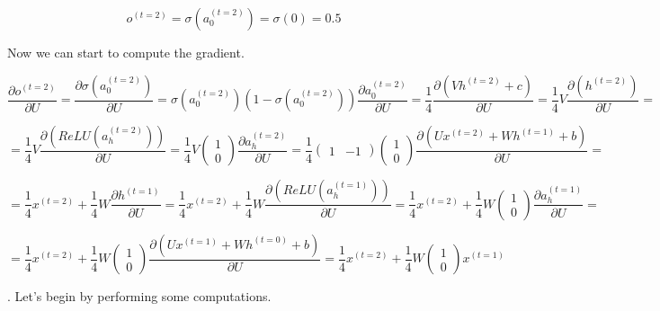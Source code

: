 $$ o^{(t=2)} = \sigma \left( a_0^{(t=2)}  \right) = \sigma(0) = 0.5 $$

\noindent Now we can start to compute the gradient.

$$ \frac{\partial o^{(t=2)}}{\partial U} = \frac{\partial \sigma \left( a_0^{(t=2)} \right)}{\partial U} = \sigma \left( a_0^{(t=2)} \right) \left(  1 - \sigma \left( a_0^{(t=2)} \right) \right) \frac{\partial a_0^{(t=2)}}{\partial U} = \frac{1}{4} \frac{\partial (V h^{(t=2)} + c)}{\partial U} = \frac{1}{4} V  \frac{\partial (h^{(t=2)})}{\partial U} =  $$

$$ = \frac{1}{4} V  \frac{\partial \left(ReLU \left(a_h^{(t=2)} \right)\right)}{\partial U} = \frac{1}{4} V \begin{pmatrix} 1 \\ 0 \end{pmatrix} \frac{\partial a_h^{(t=2)} }{\partial U} = \frac{1}{4} \begin{pmatrix} 1 & -1 \end{pmatrix} \begin{pmatrix} 1 \\ 0 \end{pmatrix} \frac{\partial \left( Ux^{(t=2)} + W h^{(t=1)} + b \right) }{\partial U} = $$ 

$$ = \frac{1}{4} x^{(t=2)} + \frac{1}{4} W \frac{\partial h^{(t=1)}}{\partial U} =  \frac{1}{4} x^{(t=2)} + \frac{1}{4} W  \frac{\partial \left(ReLU \left(a_h^{(t=1)} \right)\right)}{\partial U} = \frac{1}{4} x^{(t=2)} + \frac{1}{4} W  \begin{pmatrix} 1 \\ 0 \end{pmatrix} \frac{\partial a_h^{(t=1)} }{\partial U} = $$

$$ = \frac{1}{4} x^{(t=2)} + \frac{1}{4} W  \begin{pmatrix} 1 \\ 0 \end{pmatrix} \frac{\partial \left( Ux^{(t=1)} + W h^{(t=0)} + b \right) }{\partial U}  = \frac{1}{4} x^{(t=2)} + \frac{1}{4} W  \begin{pmatrix} 1 \\ 0 \end{pmatrix} x^{(t=1)} $$


. Let's begin by performing some computations.

